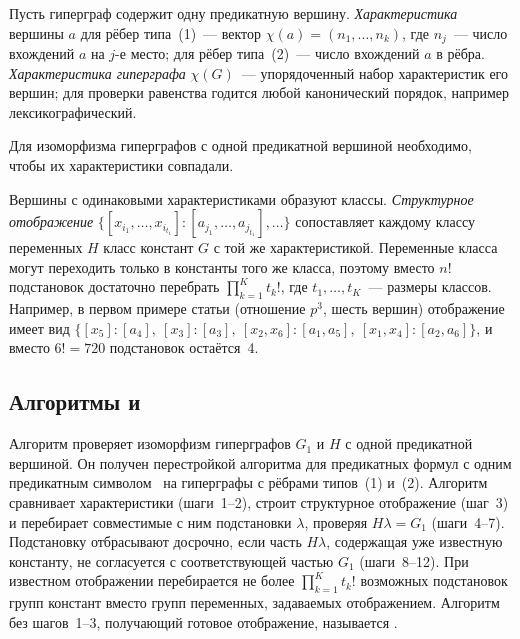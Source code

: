 Пусть гиперграф содержит одну предикатную вершину.
\emph{Характеристика} вершины $a$ для рёбер типа~(1)~--- вектор $\chi(a) = (n_1, \dots, n_k)$, где $n_j$~--- число вхождений $a$ на $j$-е место; для рёбер типа~(2)~--- число вхождений $a$ в рёбра.
\emph{Характеристика гиперграфа} $\chi(G)$~--- упорядоченный набор характеристик его вершин; для проверки равенства годится любой канонический порядок, например лексикографический.

\begin{theorem}
    Для изоморфизма гиперграфов с одной предикатной вершиной необходимо, чтобы их характеристики совпадали.
\end{theorem}

Вершины с одинаковыми характеристиками образуют классы.
\emph{Структурное отображение} $\{[x_{i_1}, \dots, x_{i_{t_1}}] : [a_{j_1}, \dots, a_{j_{t_1}}], \dots\}$ сопоставляет каждому классу переменных $H$ класс констант $G$ с той же характеристикой.
Переменные класса могут переходить только в константы того же класса, поэтому вместо $n!$ подстановок достаточно перебрать $\prod_{k=1}^{K} t_k!$, где $t_1, \dots, t_K$~--- размеры классов.
Например, в первом примере статьи (отношение $p^3$, шесть вершин) отображение имеет вид $\{[x_5]:[a_4],\ [x_3]:[a_3],\ [x_2, x_6]:[a_1, a_5],\ [x_1, x_4]:[a_2, a_6]\}$, и вместо $6! = 720$ подстановок остаётся~4.

\subsection{Алгоритмы \ISOMone{} и \ISOMn{}}

Алгоритм \ISOMone{} проверяет изоморфизм гиперграфов $G_1$ и $H$ с одной предикатной вершиной.
Он получен перестройкой алгоритма для предикатных формул с одним предикатным символом~\cite{ZhouKosovskaya2024} на гиперграфы с рёбрами типов~(1) и~(2).
Алгоритм сравнивает характеристики (шаги~1--2), строит структурное отображение (шаг~3) и перебирает совместимые с ним подстановки $\lambda$, проверяя $H\lambda = G_1$ (шаги~4--7).
Подстановку отбрасывают досрочно, если часть $H\lambda$, содержащая уже известную константу, не согласуется с соответствующей частью $G_1$ (шаги~8--12).
При известном отображении перебирается не более $\prod_{k=1}^{K} t_k!$ возможных подстановок групп констант вместо групп переменных, задаваемых отображением.
Алгоритм без шагов~1--3, получающий готовое отображение, называется \ISOMm{}.

